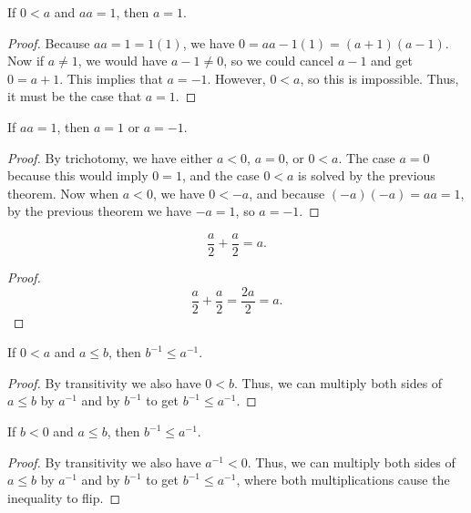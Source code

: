 \documentclass[../math.tex]{subfiles}
\begin{document}
\begin{theorem}
    If $0 < a$ and $aa = 1$, then $a = 1$.
\end{theorem}
\begin{proof}
    Because $aa = 1 = 1(1)$, we have $0 = aa - 1(1) = (a + 1)(a - 1)$.  Now if
    $a \neq 1$, we would have $a - 1 \neq 0$, so we could cancel $a - 1$ and get
    $0 = a + 1$.  This implies that $a = -1$.  However, $0 < a$, so this is
    impossible.  Thus, it must be the case that $a = 1$.
\end{proof}

\begin{theorem}
    If $aa = 1$, then $a = 1$ or $a = -1$.
\end{theorem}
\begin{proof}
    By trichotomy, we have either $a < 0$, $a = 0$, or $0 < a$.  The case $a =
    0$ because this would imply $0 = 1$, and the case $0 < a$ is solved by the
    previous theorem.  Now when $a < 0$, we have $0 < -a$, and because $(-a)(-a)
    = aa = 1$, by the previous theorem we have $-a = 1$, so $a = -1$.
\end{proof}

\begin{theorem}
    \[
        \frac{a}{2} + \frac{a}{2} = a.
    \]
\end{theorem}
\begin{proof}
    \[
        \frac{a}{2} + \frac{a}{2} = \frac{2a}{2} = a.
    \]
\end{proof}

\begin{theorem} \label{le-div-pos}
    If $0 < a$ and $a \leq b$, then $b^{-1} \leq a^{-1}$.
\end{theorem}
\begin{proof}
    By transitivity we also have $0 < b$.  Thus, we can multiply both sides
    of $a \leq b$ by $a^{-1}$ and by $b^{-1}$ to get $b^{-1} \leq a^{-1}$.
\end{proof}

\begin{theorem} \label{le-div-neg}
    If $b < 0$ and $a \leq b$, then $b^{-1} \leq a^{-1}$.
\end{theorem}
\begin{proof}
    By transitivity we also have $a^{-1} < 0$.  Thus, we can multiply both sides
    of $a \leq b$ by $a^{-1}$ and by $b^{-1}$ to get $b^{-1} \leq a^{-1}$, where
    both multiplications cause the inequality to flip.
\end{proof}
\end{document}
